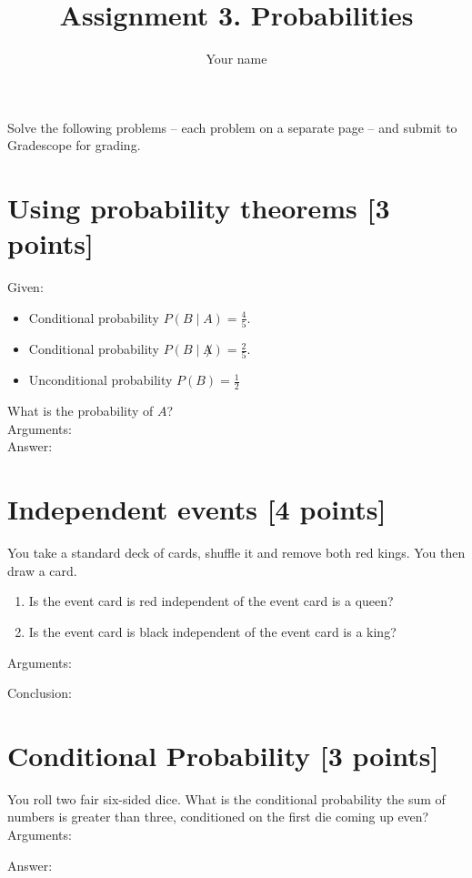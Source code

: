 \documentclass{article}
\title{Assignment 3. Probabilities}
\author{Your name}
\begin{document}
\maketitle


Solve the following problems -- each problem on a separate page -- and submit to Gradescope for grading. 

\newpage
\section{Using probability theorems [3 points]}
Given:
\begin{itemize}
    \item Conditional probability $P(B \mid A)=\frac{4}{5}$.
    \item Conditional probability $P(B \mid \not A)=\frac{2}{5}$.
    \item Unconditional probability $P(B)=\frac{1}{2}$
\end{itemize}

\noindent What is the probability of $A$?\\

Arguments:\\

Answer: 

\newpage
\section{Independent events [4 points]}
You take a standard deck of cards, shuffle it and remove both red kings. You then draw a card.
\begin{enumerate}
    \item Is the event {card is red} independent of the event {card is a queen}?
    \item Is the event {card is black} independent of the event {card is a king}?
\end{enumerate}

Arguments:

Conclusion: 

\newpage
\section{Conditional Probability [3 points]}
You roll two fair six-sided dice. What is the conditional probability the sum of numbers is greater than three, conditioned on the first die coming up even?\\

Arguments:

Answer: 
\end{document}
